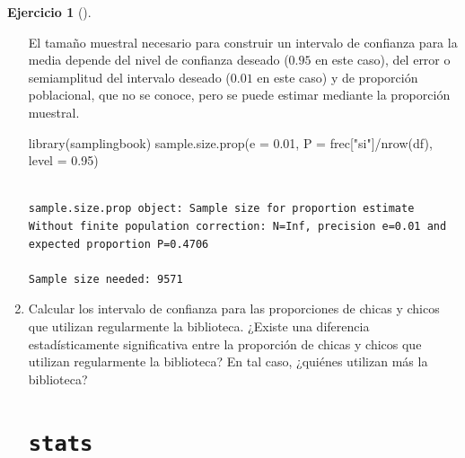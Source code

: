 \documentclass[
  a4paper,
]{scrreport}
\newenvironment{Shaded}{\begin{snugshade}}{\end{snugshade}}
\newcommand{\AttributeTok}[1]{\textcolor[rgb]{0.40,0.45,0.13}{#1}}
\newcommand{\FloatTok}[1]{\textcolor[rgb]{0.68,0.00,0.00}{#1}}
\newcommand{\FunctionTok}[1]{\textcolor[rgb]{0.28,0.35,0.67}{#1}}
\newcommand{\NormalTok}[1]{\textcolor[rgb]{0.00,0.23,0.31}{#1}}
\newcommand{\SpecialCharTok}[1]{\textcolor[rgb]{0.37,0.37,0.37}{#1}}
\newcommand{\StringTok}[1]{\textcolor[rgb]{0.13,0.47,0.30}{#1}}
\theoremstyle{definition}
\newtheorem{exercise}{Ejercicio}[chapter]
\theoremstyle{remark}
\begin{document}
\begin{exercise}[]
\begin{enumerate}
\begin{tcolorbox}
  El tamaño muestral necesario para construir un intervalo de confianza
  para la media depende del nivel de confianza deseado (\(0.95\) en este
  caso), del error o semiamplitud del intervalo deseado (\(0.01\) en
  este caso) y de proporción poblacional, que no se conoce, pero se
  puede estimar mediante la proporción muestral.

\begin{Shaded}
\begin{Highlighting}[]
\FunctionTok{library}\NormalTok{(samplingbook)}
\FunctionTok{sample.size.prop}\NormalTok{(}\AttributeTok{e =} \FloatTok{0.01}\NormalTok{, }\AttributeTok{P =}\NormalTok{ frec[}\StringTok{"si"}\NormalTok{]}\SpecialCharTok{/}\FunctionTok{nrow}\NormalTok{(df), }\AttributeTok{level =} \FloatTok{0.95}\NormalTok{)}
\end{Highlighting}
\end{Shaded}

\begin{verbatim}

sample.size.prop object: Sample size for proportion estimate
Without finite population correction: N=Inf, precision e=0.01 and expected proportion P=0.4706

Sample size needed: 9571
\end{verbatim}

  \end{tcolorbox}
\item
  Calcular los intervalo de confianza para las proporciones de chicas y
  chicos que utilizan regularmente la biblioteca. ¿Existe una diferencia
  estadísticamente significativa entre la proporción de chicas y chicos
  que utilizan regularmente la biblioteca? En tal caso, ¿quiénes
  utilizan más la biblioteca?

  \begin{tcolorbox}[enhanced jigsaw, breakable, toptitle=1mm, colbacktitle=quarto-callout-tip-color!10!white, rightrule=.15mm, opacityback=0, opacitybacktitle=0.6, titlerule=0mm, coltitle=black, colframe=quarto-callout-tip-color-frame, colback=white, bottomtitle=1mm, leftrule=.75mm, toprule=.15mm, title=\textcolor{quarto-callout-tip-color}{\faLightbulb}\hspace{0.5em}{Solución}, arc=.35mm, bottomrule=.15mm, left=2mm]

  \section{\texorpdfstring{\texttt{stats}}{stats}}


\end{tcolorbox}
\end{enumerate}
\end{exercise}
\end{document}
